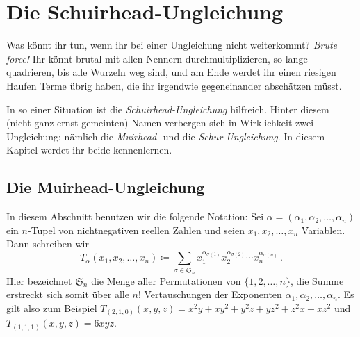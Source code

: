 \section{Die Schuirhead-Ungleichung}\label{kapitel:Schuirhead}

Was könnt ihr tun, wenn ihr bei einer Ungleichung nicht weiterkommt? \emph{Brute force!} Ihr könnt brutal mit allen Nennern durchmultiplizieren, so lange quadrieren, bis alle Wurzeln weg sind, und am Ende werdet ihr einen riesigen Haufen Terme übrig haben, die ihr irgendwie gegeneinander abschätzen müsst.

In so einer Situation ist die \emph{Schuirhead-Ungleichung} hilfreich. Hinter diesem (nicht ganz ernst gemeinten) Namen verbergen sich in Wirklichkeit zwei Ungleichung: nämlich die \emph{Muirhead-} und die \emph{Schur-Ungleichung}. In diesem Kapitel werdet ihr beide kennenlernen.

\subsection*{Die Muirhead-Ungleichung}

In diesem Abschnitt benutzen wir die folgende Notation: Sei $\alpha= (\alpha_1,\alpha_2,\dotsc,\alpha_n)$ ein $n$-Tupel von nichtnegativen reellen Zahlen und seien $x_1,x_2,\dotsc,x_n$ Variablen. Dann schreiben wir
\begin{equation*}
	T_\alpha(x_1,x_2,\dotsc,x_n)\coloneqq \sum_{\sigma\in\mathfrak S_n}x_{1}^{\alpha_{\sigma(1)}}x_{2}^{\alpha_{\sigma(2)}}\dotsm x_{n}^{\alpha_{\sigma(n)}}\,.
\end{equation*}
Hier bezeichnet $\mathfrak S_n$ die Menge aller Permutationen von $\{1,2,\dotsc,n\}$, die Summe erstreckt sich somit über alle $n!$ Vertauschungen der Exponenten $\alpha_1,\alpha_2,\dotsc,\alpha_n$. Es gilt also zum Beispiel $T_{(2,1,0)}(x,y,z)=x^2y+xy^2+y^2z+yz^2+z^2x+xz^2$ und $T_{(1,1,1)}(x,y,z)=6xyz$.%

